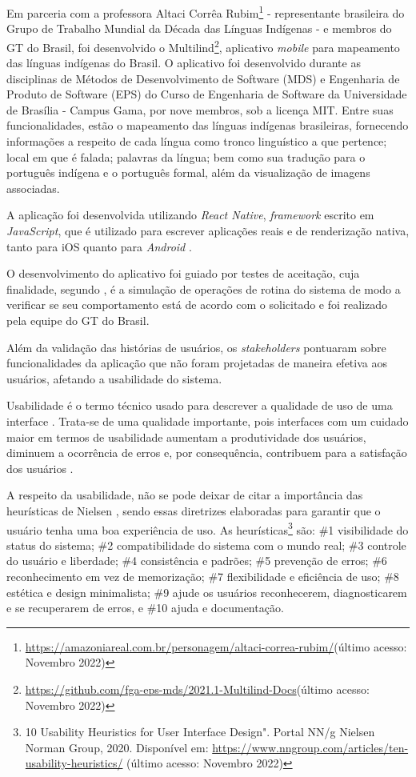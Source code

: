 Em parceria com a professora Altaci Corrêa Rubim\footnote{\url{https://amazoniareal.com.br/personagem/altaci-correa-rubim/}(último acesso: Novembro 2022)} - representante
brasileira do Grupo de Trabalho Mundial da Década das Línguas Indígenas - e membros do GT do Brasil, foi desenvolvido o
Multilind\footnote{\url{https://github.com/fga-eps-mds/2021.1-Multilind-Docs}(último acesso: Novembro 2022)}, aplicativo \textit{mobile} para mapeamento das línguas
indígenas do Brasil. O aplicativo foi desenvolvido durante as disciplinas de Métodos de Desenvolvimento de Software (MDS) e Engenharia de Produto de Software (EPS) do
Curso de Engenharia de Software da Universidade de Brasília - Campus Gama, por nove membros, sob a licença MIT. Entre suas funcionalidades, estão o mapeamento das línguas
indígenas brasileiras, fornecendo informações a respeito de cada língua como tronco linguístico a que pertence; local em que é falada; palavras da língua; bem como sua
tradução para o português indígena e o português formal, além da visualização de imagens associadas.

A aplicação foi desenvolvida utilizando \textit{React Native}, \textit{framework} escrito em \textit{JavaScript}, que é utilizado para escrever aplicações reais e de
renderização nativa, tanto para iOS quanto para \textit{Android} \cite{eiseman2017}.

O desenvolvimento do aplicativo foi guiado por testes de aceitação, cuja finalidade, segundo , é a simulação de operações de rotina do sistema de
modo a verificar se seu comportamento está de acordo com o solicitado e foi realizado pela equipe do GT do Brasil.

Além da validação das histórias de usuários, os \textit{stakeholders} pontuaram sobre funcionalidades da aplicação que não foram projetadas de maneira efetiva aos
usuários, afetando a usabilidade do sistema.

Usabilidade é o termo técnico usado para descrever a qualidade de uso de uma interface \cite{bevan1995}. Trata-se de uma qualidade importante, pois interfaces com um
cuidado maior em termos de usabilidade aumentam a produtividade dos usuários, diminuem a ocorrência de erros e, por consequência, contribuem para a satisfação dos
usuários \cite{winckler2022}.

A respeito da usabilidade, não se pode deixar de citar a importância das heurísticas de Nielsen \cite{nielsen1994}, sendo essas diretrizes elaboradas para garantir que o
usuário tenha uma boa experiência de uso. As heurísticas\footnote{10 Usability Heuristics for User Interface Design". Portal NN/g Nielsen Norman Group, 2020. Disponível
em: \url{https://www.nngroup.com/articles/ten-usability-heuristics/} (último acesso: Novembro 2022)} são: \#1 visibilidade do status do sistema; \#2 compatibilidade do
sistema com o mundo real; \#3 controle do usuário e liberdade; \#4 consistência e padrões; \#5 prevenção de erros; \#6 reconhecimento em vez de memorização; \#7
flexibilidade e eficiência de uso; \#8 estética e design minimalista; \#9 ajude os usuários reconhecerem, diagnosticarem e se recuperarem de erros, e \#10 ajuda e
documentação.

